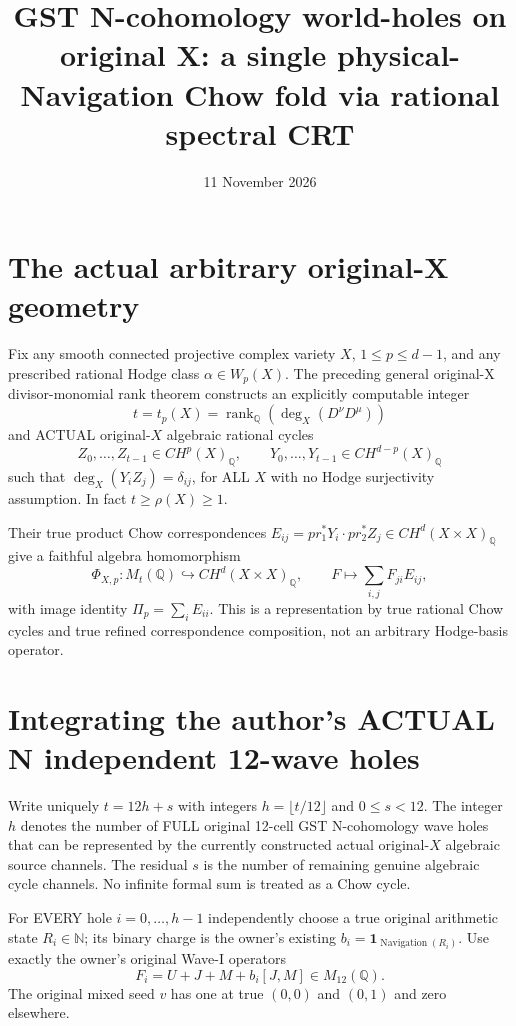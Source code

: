 \documentclass[11pt]{article}
\title{GST N-cohomology world-holes on original X: a single physical-Navigation Chow fold via rational spectral CRT}
\date{11 November 2026}
\begin{document}
\maketitle

\section{The actual arbitrary original-X geometry}

Fix any smooth connected projective complex variety $X$,
$1\le p\le d-1$, and any prescribed rational Hodge class
$\alpha\in W_p(X)$.
The preceding general original-X divisor-monomial rank theorem
constructs an explicitly computable integer
\[
t=t_p(X)=\operatorname{rank}_{\mathbb Q}
\left(\deg_X(D^\nu D^\mu)\right)
\]
and ACTUAL original-$X$ algebraic rational cycles
\[
Z_0,\ldots,Z_{t-1}\in CH^p(X)_{\mathbb Q},\qquad
Y_0,\ldots,Y_{t-1}\in CH^{d-p}(X)_{\mathbb Q}
\]
such that $\deg_X(Y_iZ_j)=\delta_{ij}$, for ALL $X$
with no Hodge surjectivity assumption. In fact
$t\ge\rho(X)\ge1$.

Their true product Chow correspondences
$E_{ij}=pr_1^*Y_i\cdot pr_2^*Z_j\in CH^d(X\times X)_{\mathbb Q}$
give a faithful algebra homomorphism
\[
\Phi_{X,p}:M_t(\mathbb Q)\hookrightarrow
CH^d(X\times X)_{\mathbb Q},\qquad
F\longmapsto\sum_{i,j}F_{ji}E_{ij},
\]
with image identity $\Pi_p=\sum_iE_{ii}$.
This is a representation by true rational Chow cycles
and true refined correspondence composition,
not an arbitrary Hodge-basis operator.

\section{Integrating the author's ACTUAL N independent 12-wave holes}

Write uniquely $t=12h+s$ with integers
$h=\lfloor t/12\rfloor$ and $0\le s<12$.
The integer $h$ denotes the number of FULL original
12-cell GST N-cohomology wave holes that can be
represented by the currently constructed actual
original-$X$ algebraic source channels. The residual
$s$ is the number of remaining genuine algebraic
cycle channels. No infinite formal sum is treated
as a Chow cycle.

For EVERY hole $i=0,\ldots,h-1$ independently choose
a true original arithmetic state $R_i\in\mathbb N$;
its binary charge is the owner's existing
$b_i=\mathbf1_{\operatorname{Navigation}(R_i)}$.
Use exactly the owner's original Wave-I operators
\[
F_i=U+J+M+b_i[J,M]\in M_{12}(\mathbb Q).
\]
The original mixed seed $v$ has one at true
$(0,0)$ and $(0,1)$ and zero elsewhere.
\end{document}
